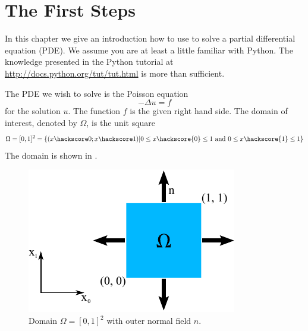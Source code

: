 
%
%
%


\section{The First Steps}\label{FirstSteps} 
In this chapter we give an introduction how to use \escript to solve 
a partial differential equation (PDE).
We assume you are at least a little familiar with Python.
The knowledge presented in the Python tutorial at \url{http://docs.python.org/tut/tut.html} is more than sufficient.

The PDE we wish to solve is the Poisson equation 
\begin{equation}
    -\Delta u=f 
    \label{eq:FirstSteps.1}
\end{equation}
for the solution $u$. The function $f$ is the given right hand side. The domain of interest, denoted by $\Omega$,
is the unit square 
\begin{equation}
\Omega=[0,1]^2=\{ (x\hackscore 0;x\hackscore 1) | 0\le x\hackscore{0} \le 1 \mbox{ and } 0\le x\hackscore{1} \le 1 \}
\label{eq:FirstSteps.1b}
\end{equation}
The domain is shown in .
\begin{figure}[ht]
    \centerline{\includegraphics{figures/FirstStepDomain}}
    \caption{Domain $\Omega=[0,1]^2$ with outer normal field $n$.}
    \label{fig:FirstSteps.1}
\end{figure}

